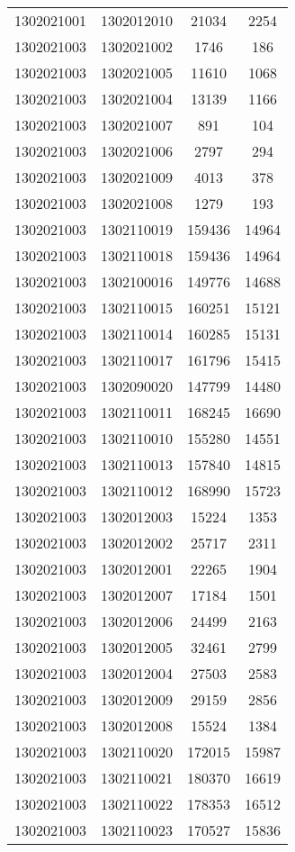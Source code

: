 \begin{longtable}[h]{llcc}
		1302021001 & 1302012010 & 21034 & 2254\\
		1302021003 & 1302021002 & 1746 & 186\\
		1302021003 & 1302021005 & 11610 & 1068\\
		1302021003 & 1302021004 & 13139 & 1166\\
		1302021003 & 1302021007 & 891 & 104\\
		1302021003 & 1302021006 & 2797 & 294\\
		1302021003 & 1302021009 & 4013 & 378\\
		1302021003 & 1302021008 & 1279 & 193\\
		1302021003 & 1302110019 & 159436 & 14964\\
		1302021003 & 1302110018 & 159436 & 14964\\
		1302021003 & 1302100016 & 149776 & 14688\\
		1302021003 & 1302110015 & 160251 & 15121\\
		1302021003 & 1302110014 & 160285 & 15131\\
		1302021003 & 1302110017 & 161796 & 15415\\
		1302021003 & 1302090020 & 147799 & 14480\\
		1302021003 & 1302110011 & 168245 & 16690\\
		1302021003 & 1302110010 & 155280 & 14551\\
		1302021003 & 1302110013 & 157840 & 14815\\
		1302021003 & 1302110012 & 168990 & 15723\\
		1302021003 & 1302012003 & 15224 & 1353\\
		1302021003 & 1302012002 & 25717 & 2311\\
		1302021003 & 1302012001 & 22265 & 1904\\
		1302021003 & 1302012007 & 17184 & 1501\\
		1302021003 & 1302012006 & 24499 & 2163\\
		1302021003 & 1302012005 & 32461 & 2799\\
		1302021003 & 1302012004 & 27503 & 2583\\
		1302021003 & 1302012009 & 29159 & 2856\\
		1302021003 & 1302012008 & 15524 & 1384\\
		1302021003 & 1302110020 & 172015 & 15987\\
		1302021003 & 1302110021 & 180370 & 16619\\
		1302021003 & 1302110022 & 178353 & 16512\\
		1302021003 & 1302110023 & 170527 & 15836\\

\end{longtable}
